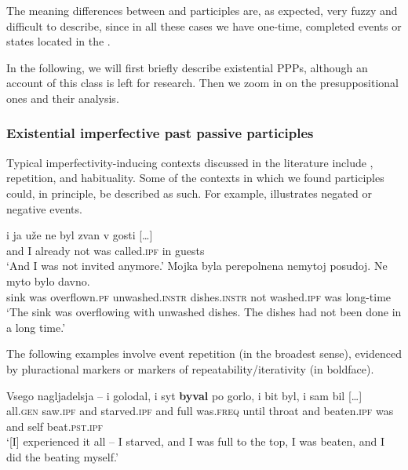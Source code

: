 \documentclass[output=paper,modfonts,newtxmath,hidelinks]{langscibook}
\begin{document}
\noindent The meaning differences between  and  participles are, as expected, very fuzzy and difficult to describe, since in all these cases we have one-time, completed events or states located in the . 

In the following,  we will first briefly describe existential  PPPs, although an account of this class is left for  research. Then we  zoom in on the presuppositional ones and their analysis.

\subsubsection{Existential imperfective past passive participles}

Typical imperfectivity-inducing contexts discussed in the literature include , repetition, and habituality. Some of the contexts in which we found  participles could, in principle, be described as such. For example,  illustrates negated or negative events. 

\ea\label{negOF}
\ea\gll	[\dots] i ja uže ne byl zvan v gosti [\dots]\\
	{} and I already not was called.\textsc{ipf} in guests \\
\glt `And I was not invited anymore.' 
\ex\gll	Mojka byla perepolnena nemytoj posudoj. Ne myto bylo davno.\\
   	sink was overflown.\textsc{pf} unwashed.\textsc{instr} dishes.\textsc{instr} not washed.\textsc{ipf} was long-time\\
\glt	`The sink was overflowing with unwashed dishes. The dishes had not been done in a long time.'\label{17c}
\z\z

\noindent The following examples involve event repetition (in the broadest sense), evidenced by pluractional markers  or markers of repeatability/iterativity  (in boldface).

\ea\gll	Vsego nagljadelsja -- i golodal, i syt \textbf{byval} po gorlo, i bit byl, i sam bil [\dots] \label{golodal}\\
	all.\textsc{gen} saw.\textsc{ipf} {} and starved.\textsc{ipf} and full was.\textsc{freq} until throat and beaten.\textsc{ipf} was and self beat.\textsc{pst}.\textsc{ipf}\\
\glt	`[I] experienced it all -- I starved, and I was full to the top, I was beaten, and I did the beating myself.'\label{bit} 
\z
\end{document}
